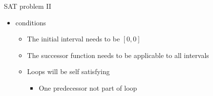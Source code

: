 \documentclass[10pt]{beamer}
\begin{document}
\begin{frame}{SAT problem II}
\begin{itemize}
	\item conditions
	\pause
	\begin{itemize}
		\item The initial interval needs to be $[0, 0]$
		\pause
		\item The successor function needs to be applicable to all intervals
		\pause
		\item Loops will be self satisfying 
		\pause
		\begin{itemize}
			\item One predecessor not part of loop
		\end{itemize}
	\end{itemize}
\end{itemize}
\end{frame}
\end{document}
